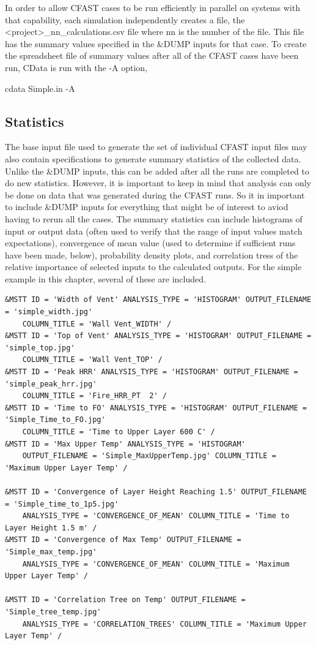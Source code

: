 \documentclass[12pt,twoside]{book}
\begin{document}
In order to allow CFAST cases to be run efficiently in parallel on systems with that capability, each simulation independently creates a file, the {\ct <project>\_nn\_calculations.csv} file where {\ct nn} is the number of the file. This file has the summary values specified in the {\ct \&DUMP} inputs for that case. To create the spreadsheet file of summary values after all of the CFAST cases have been run, CData is run with the {\ct -A} option,

\vspace{\baselineskip}
{\ct cdata Simple.in -A}

\subsection{Statistics}

The base input file used to generate the set of individual CFAST input files may also contain specifications to generate summary statistics of the collected data. Unlike the {\ct \&DUMP} inputs, this can be added after all the runs are completed to do new statistics. However, it is important to keep in mind that analysis can only be done on data that was generated during the CFAST runs. So it in important to include {\ct \&DUMP} inputs for everything that might be of interest to aviod having to rerun all the cases. The summary statistics can include histograms of input or output data (often used to verify that the range of input values match expectations), convergence of mean value (used to determine if sufficient runs have been made, below), probability density plots, and correlation tress of the relative importance of selected inputs to the calculated outputs. For the simple example in this chapter, several of these are included.

\begin{lstlisting}[basicstyle=\scriptsize]
&MSTT ID = 'Width of Vent' ANALYSIS_TYPE = 'HISTOGRAM' OUTPUT_FILENAME = 'simple_width.jpg'
	COLUMN_TITLE = 'Wall Vent_WIDTH' /
&MSTT ID = 'Top of Vent' ANALYSIS_TYPE = 'HISTOGRAM' OUTPUT_FILENAME = 'simple_top.jpg'
	COLUMN_TITLE = 'Wall Vent_TOP' /
&MSTT ID = 'Peak HRR' ANALYSIS_TYPE = 'HISTOGRAM' OUTPUT_FILENAME = 'simple_peak_hrr.jpg'
	COLUMN_TITLE = 'Fire_HRR_PT  2' /
&MSTT ID = 'Time to FO' ANALYSIS_TYPE = 'HISTOGRAM' OUTPUT_FILENAME = 'Simple_Time_to_FO.jpg'
	COLUMN_TITLE = 'Time to Upper Layer 600 C' /
&MSTT ID = 'Max Upper Temp' ANALYSIS_TYPE = 'HISTOGRAM'
	OUTPUT_FILENAME = 'Simple_MaxUpperTemp.jpg' COLUMN_TITLE = 'Maximum Upper Layer Temp' /

&MSTT ID = 'Convergence of Layer Height Reaching 1.5' OUTPUT_FILENAME = 'Simple_time_to_1p5.jpg'
	ANALYSIS_TYPE = 'CONVERGENCE_OF_MEAN' COLUMN_TITLE = 'Time to Layer Height 1.5 m' /
&MSTT ID = 'Convergence of Max Temp' OUTPUT_FILENAME = 'Simple_max_temp.jpg'
	ANALYSIS_TYPE = 'CONVERGENCE_OF_MEAN' COLUMN_TITLE = 'Maximum Upper Layer Temp' /

&MSTT ID = 'Correlation Tree on Temp' OUTPUT_FILENAME = 'Simple_tree_temp.jpg'
	ANALYSIS_TYPE = 'CORRELATION_TREES' COLUMN_TITLE = 'Maximum Upper Layer Temp' /
\end{lstlisting}
\end{document}
